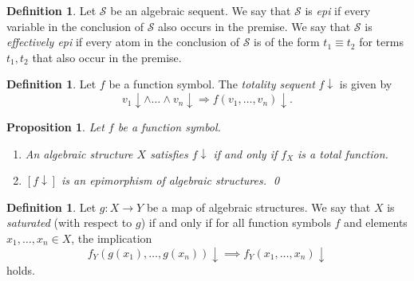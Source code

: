 \documentclass[a4paper]{article}
\newtheorem{proposition}[theorem]{Proposition}
\theoremstyle{remark}
\theoremstyle{definition}
\newtheorem{definition}[theorem]{Definition}
\begin{document}
\begin{definition}
  Let $\mathcal{S}$ be an algebraic sequent.
  We say that $\mathcal{S}$ is \emph{epi} if every variable in the conclusion of $\mathcal{S}$ also occurs in the premise.
  We say that $\mathcal{S}$ is \emph{effectively epi} if every atom in the conclusion of $\mathcal{S}$ is of the form $t_1 \equiv t_2$ for terms $t_1, t_2$ that also occur in the premise.
\end{definition}

\begin{definition}
  Let $f$ be a function symbol.
  The \emph{totality sequent} $f \downarrow$ is given by
  \begin{equation}
    v_1 \downarrow \land \dots \land v_n \downarrow \Rightarrow f(v_1, \dots, v_n)\downarrow.
  \end{equation}
\end{definition}

\begin{proposition}
  Let $f$ be a function symbol. 
  \begin{enumerate}
    \item
      An algebraic structure $X$ satisfies $f \downarrow$ if and only if $f_X$ is a total function.
    \item
      $[f \downarrow]$ is an epimorphism of algebraic structures.
      \qed
  \end{enumerate}
\end{proposition}

\begin{definition}
  Let $g : X \rightarrow Y$ be  a map of algebraic structures.
  We say that $X$ is \emph{saturated} (with respect to $g$) if and only if for all function symbols $f$ and elements $x_1, \dots, x_n \in X$, the implication
  \begin{equation}
    f_Y(g(x_1), \dots, g(x_n)) \downarrow \implies f_Y(x_1, \dots, x_n) \downarrow
  \end{equation}
  holds.
\end{definition}
\end{document}
